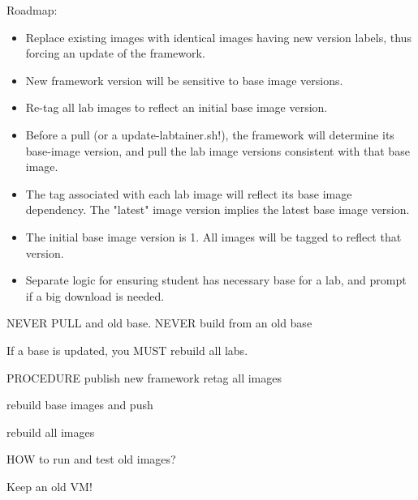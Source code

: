 Roadmap:  
\begin{itemize}
\item Replace existing images with identical images having new version labels,
thus forcing an update of the framework.
\item New framework version will be sensitive to base image versions.

\item Re-tag all lab images to reflect an initial base image version.

\item Before a pull (or a update-labtainer.sh!), the framework will determine its 
base-image version, and pull the lab image versions consistent with that base image.

\item The tag associated with each lab image will reflect its base image
dependency.  The "latest" image version implies the latest base image version.

\item The initial base image version is 1.  All images will be tagged to reflect
that version.

\item Separate logic for ensuring student has necessary base for a lab, and prompt if 
a big download is needed.
\end{itemize}

NEVER PULL and old base.  NEVER build from an old base

If a base is updated, you MUST rebuild all labs.  



PROCEDURE
publish new framework
retag all images

rebuild base images and push

rebuild all images


HOW to run and test old images?

Keep an old VM!




